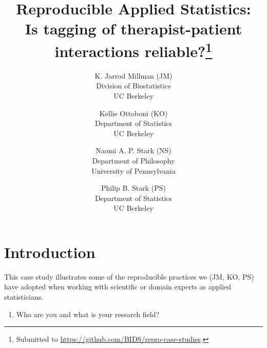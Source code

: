 \documentclass[]{article}
\date{}
\begin{document}
\title{Reproducible Applied Statistics:\\
Is tagging of therapist-patient interactions reliable?\thanks{Submitted
to \url{https://github.com/BIDS/repro-case-studies}.
}}

\author{K. Jarrod Millman (JM)\\ Division of Biostatistics\\ UC Berkeley \and
Kellie Ottoboni (KO)\\ Department of Statistics\\ UC Berkeley \and
Naomi A. P. Stark (NS)\\ Department of Philosophy\\ University of Pennsylvania \and
Philip B. Stark (PS)\\ Department of Statistics\\ UC Berkeley
}


\maketitle


\section{Introduction}

This case study illustrates some of the reproducible practices we (JM, KO, PS)
have adopted when working with scientific or domain experts as applied
statisticians.

\begin{enumerate}
\def\labelenumi{\arabic{enumi})}
\itemsep1pt\parskip0pt
\item
  Who are you and what is your research field?
\end{enumerate}

\end{document}
